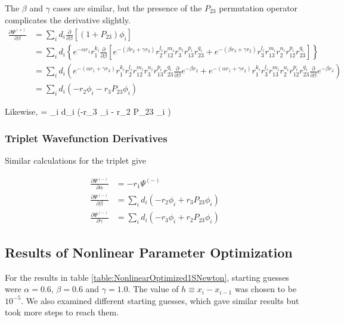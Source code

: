 \documentclass[Dissertation.tex]{subfiles}
\begin{document}
The $\beta$ and $\gamma$ cases are similar, but the presence of the $P_{23}$ permutation operator complicates the derivative slightly.
\begin{align}
\nonumber \frac{\partial \Psi^{(+)}}{\partial \beta} &= \sum_i d_i \frac{\partial}{\partial \beta} \left[(1+P_{23}) \phi_i \right] \\
\nonumber &= \sum_i d_i \left\{
  e^{-\alpha r_1} r_1^{k_i} \frac{\partial}{\partial \beta}
  \left[e^{-(\beta r_2 + \gamma r_3)} r_2^{l_i} r_{12}^{m_i} r_3^{n_i} r_{13}^{p_i} r_{23}^{q_i}
      + e^{-(\beta r_3 + \gamma r_2)} r_3^{l_i} r_{13}^{m_i} r_2^{n_i} r_{12}^{p_i} r_{23}^{q_i} \right] \right\} \\
\nonumber &= \sum_i d_i \left(
  e^{-(\alpha r_1 + \gamma r_3)} r_1^{k_i} r_2^{l_i} r_{12}^{m_i} r_3^{n_i} r_{13}^{p_i} r_{23}^{q_i} \frac{\partial}{\partial \beta} e^{-\beta r_2} +
  e^{-(\alpha r_1 + \gamma r_2)} r_1^{k_i} r_3^{l_i} r_{13}^{m_i} r_2^{n_i} r_{12}^{p_i} r_{23}^{q_i} \frac{\partial}{\partial \beta} e^{-\beta r_3} \right) \\
 &= \sum_i d_i \left(-r_2 \phi_i - r_3 P_{23} \phi_i \right) 
\label{eq:PsiDerBeta}
\end{align}

Likewise,
\beq
\frac{\partial \Psi^{(+)}}{\partial \gamma} = \sum_i d_i \left(-r_3 \phi_i - r_2 P_{23} \phi_i \right)
\label{eq:PsiDerGamma}
\eeq


\subsubsection{Triplet Wavefunction Derivatives}
Similar calculations for the triplet give

\begin{align}
\frac{\partial \Psi^{(-)}}{\partial \alpha} &= -r_1 \Psi^{(-)} \label{eq:PsiTripletDerAlpha} \\
\frac{\partial \Psi^{(-)}}{\partial \beta} &= \sum_i d_i \left(-r_2 \phi_i + r_3 P_{23} \phi_i \right) \label{eq:PsiTripletDerBeta} \\
\frac{\partial \Psi^{(-)}}{\partial \gamma} &= \sum_i d_i \left(-r_3 \phi_i + r_2 P_{23} \phi_i \right) \label{eq:PsiTripletDerGamma}
\end{align}


\subsection{Results of Nonlinear Parameter Optimization}

For the results in table \ref{table:NonlinearOptimized1SNewton}, starting guesses were $\alpha = 0.6$, $\beta = 0.6$ and $\gamma = 1.0$.  The value of $h \equiv x_i - x_{i-1}$ was chosen to be $10^{-5}$.  We also examined different starting guesses, which gave similar results but took more steps to reach them.
\end{document}
